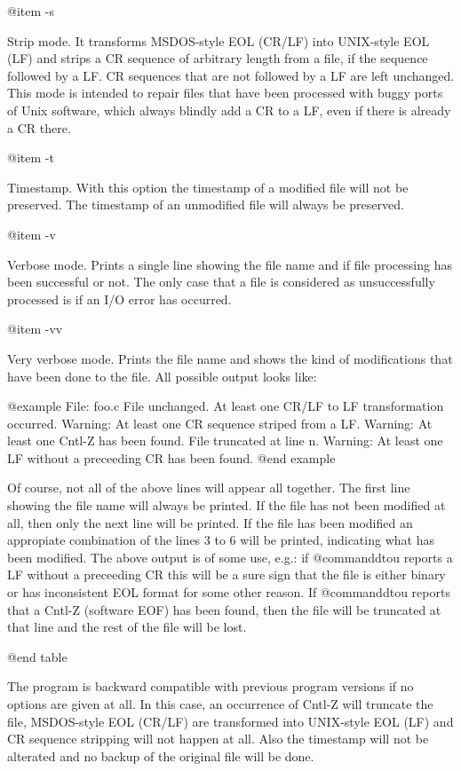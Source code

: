 @item -s

Strip mode.  It transforms MSDOS-style EOL (CR/LF) into UNIX-style EOL (LF)
and strips a CR sequence of arbitrary length from a file, if the sequence
followed by a LF.  CR sequences that are not followed by a LF are left
unchanged.  This mode is intended to repair files that have been processed
with buggy ports of Unix software, which always blindly add a CR to a LF,
even if there is already a CR there.

@item -t

Timestamp.  With this option the timestamp of a modified file will not be
preserved.  The timestamp of an unmodified file will always be preserved.

@item -v

Verbose mode.  Prints a single line showing the file name and if file
processing has been successful or not.  The only case that a file is
considered as unsuccessfully processed is if an I/O error has occurred.

@item -vv

Very verbose mode.  Prints the file name and shows the kind of modifications
that have been done to the file.  All possible output looks like:

@example
File: foo.c
File unchanged.
At least one CR/LF to LF transformation occurred.
Warning: At least one CR sequence striped from a LF.
Warning: At least one Cntl-Z has been found. File truncated
         at line n.
Warning: At least one LF without a preceeding CR has been found.
@end example

Of course, not all of the above lines will appear all together.  The first
line showing the file name will always be printed.  If the file has not been
modified at all, then only the next line will be printed.  If the file has
been modified an appropiate combination of the lines 3 to 6 will be printed,
indicating what has been modified.  The above output is of some use, e.g.:
if @command{dtou} reports a LF without a preceeding CR this will be a sure sign
that the file is either binary or has inconsistent EOL format for some other
reason.  If @command{dtou} reports that a Cntl-Z (software EOF) has been found,
then the file will be truncated at that line and the rest of the file will be
lost.

@end table

The program is backward compatible with previous program versions if no options
are given at all.  In this case, an occurrence of Cntl-Z will truncate the file,
MSDOS-style EOL (CR/LF) are transformed into UNIX-style EOL (LF) and CR sequence
stripping will not happen at all.  Also the timestamp will not be alterated and
no backup of the original file will be done.


